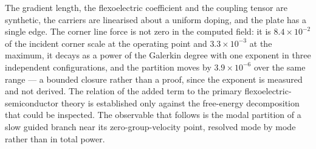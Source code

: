 The gradient length, the flexoelectric coefficient and the coupling tensor are
synthetic, the carriers are linearised about a uniform doping, and the plate has a
single edge.  The corner line force is not zero in the computed field: it is
$8.4\times10^{-2}$ of the incident corner scale at the operating point and
$3.3\times10^{-3}$ at the maximum, it decays as a power of the Galerkin degree with
one exponent in three independent configurations, and the partition moves by
$3.9\times10^{-6}$ over the same range --- a bounded closure rather than a proof,
since the exponent is measured and not derived.  The relation of the added
term to the primary flexoelectric-semiconductor theory is established only
against the free-energy decomposition that could be inspected.  The observable
that follows is the modal partition of a slow guided branch near its
zero-group-velocity point, resolved mode by mode rather than in total power.
